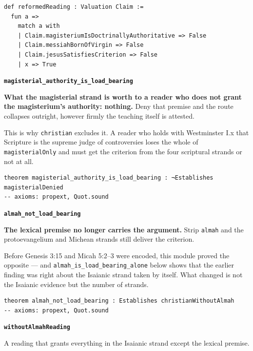 \documentclass[11pt]{article}
\begin{document}
{\small\begin{verbatim}
def reformedReading : Valuation Claim :=
  fun a =>
    match a with
    | Claim.magisteriumIsDoctrinallyAuthoritative => False
    | Claim.messiahBornOfVirgin => False
    | Claim.jesusSatisfiesCriterion => False
    | x => True
\end{verbatim}}
\par\medskip\noindent\textbf{\texttt{magisterial\_\allowbreak{}authority\_\allowbreak{}is\_\allowbreak{}load\_\allowbreak{}bearing}}\par\nobreak\noindent
\textbf{What the magisterial strand is worth to a reader who does not grant the magisterium’s authority: nothing.} Deny that premise and the route collapses outright, however firmly the teaching itself is attested.

This is why \texttt{christian} excludes it. A reader who holds with Westminster I.x that Scripture is the supreme judge of controversies loses the whole of \texttt{magisterial\allowbreak{}Only} and must get the criterion from the four scriptural strands or not at all.

{\small\begin{verbatim}
theorem magisterial_authority_is_load_bearing : ¬Establishes magisterialDenied
-- axioms: propext, Quot.sound
\end{verbatim}}
\par\medskip\noindent\textbf{\texttt{almah\_\allowbreak{}not\_\allowbreak{}load\_\allowbreak{}bearing}}\par\nobreak\noindent
\textbf{The lexical premise no longer carries the argument.} Strip \texttt{almah} and the protoevangelium and Michean strands still deliver the criterion.

Before Genesis 3:15 and Micah 5:2–3 were encoded, this module proved the opposite — and \texttt{almah\_\allowbreak{}is\_\allowbreak{}load\_\allowbreak{}bearing\_\allowbreak{}alone} below shows that the earlier finding was right about the Isaianic strand taken by itself. What changed is not the Isaianic evidence but the number of strands.

{\small\begin{verbatim}
theorem almah_not_load_bearing : Establishes christianWithoutAlmah
-- axioms: propext, Quot.sound
\end{verbatim}}
\par\medskip\noindent\textbf{\texttt{without\allowbreak{}Almah\allowbreak{}Reading}}\par\nobreak\noindent
A reading that grants everything in the Isaianic strand except the lexical premise.
\end{document}
